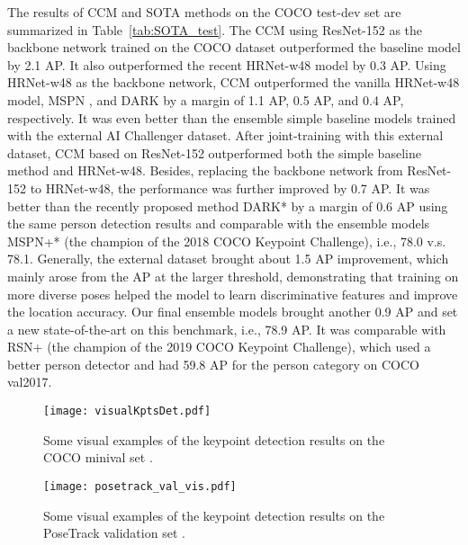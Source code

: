 \documentclass[twocolumn]{svjour3}          \smartqed  \usepackage{natbib}
\begin{document}
The results of CCM and SOTA methods on the COCO test-dev set are summarized in Table~\ref{tab:SOTA_test}. The CCM using ResNet-152 as the backbone network trained on the COCO dataset outperformed the baseline model \citep{xiao2018simple} by 2.1 AP. It also outperformed the recent HRNet-w48 model \citep{sun2019deep} by 0.3 AP. Using HRNet-w48 as the backbone network, CCM outperformed the vanilla HRNet-w48 model, MSPN \citep{li2019rethinking}, and DARK \citep{zhang2020distribution} by a margin of 1.1 AP, 0.5 AP, and 0.4 AP, respectively. It was even better than the ensemble simple baseline models trained with the external AI Challenger dataset. After joint-training with this external dataset, CCM based on ResNet-152 outperformed both the simple baseline method and HRNet-w48. Besides, replacing the backbone network from ResNet-152 to HRNet-w48, the performance was further improved by 0.7 AP. It was better than the recently proposed method DARK* \citep{zhang2020distribution} by a margin of 0.6 AP using the same person detection results and comparable with the ensemble models MSPN+* \citep{li2019rethinking} (the champion of the 2018 COCO Keypoint Challenge), i.e., 78.0 v.s. 78.1. Generally, the external dataset brought about 1.5 AP improvement, which mainly arose from the AP at the larger threshold, demonstrating that training on more diverse poses helped the model to learn discriminative features and improve the location accuracy. Our final ensemble models brought another 0.9 AP and set a new state-of-the-art on this benchmark, i.e., 78.9 AP. It was comparable with RSN+ \citep{cai2020learning} (the champion of the 2019 COCO Keypoint Challenge), which used a better person detector and had 59.8 AP for the person category on COCO val2017.

\begin{figure*}[htbp]
\begin{center}
   \texttt{[image: visualKptsDet.pdf]}
\end{center}
   \caption{Some visual examples of the keypoint detection results on the COCO minival set \citep{lin2014microsoft}.}
\label{fig:visualDet}
\end{figure*}

\begin{figure*}[htbp]
\begin{center}
   \texttt{[image: posetrack\_val\_vis.pdf]}
\end{center}
   \caption{Some visual examples of the keypoint detection results on the PoseTrack validation set \citep{Andriluka2018PoseTrack}.}
\label{fig:visualDet_posetrack}
\end{figure*}
\end{document}
